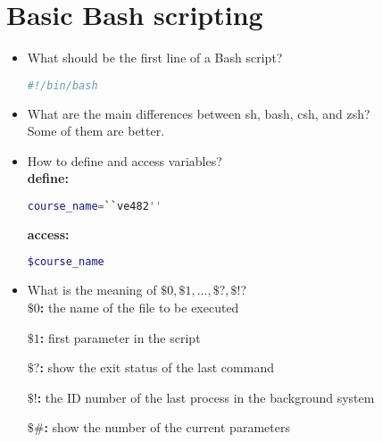 \documentclass{article}
\begin{document}
\section{Basic Bash scripting}
\begin{itemize}
\item What should be the first line of a Bash script?\\
\begin{lstlisting}[language=bash]
#!/bin/bash
\end{lstlisting}
\item What are the main differences between sh, bash, csh, and zsh?\\
Some of them are better.
\item How to define and access variables?\\
\textbf{define:}
\begin{lstlisting}[language=bash]
course_name=``ve482''
\end{lstlisting}
\textbf{access:}
\begin{lstlisting}[language=bash]
$course_name
\end{lstlisting}
\item What is the meaning of $\$0, \$1,..., \$?, \$!$?\\
\textbf{$\$0$:} the name of the file to be executed

\textbf{$\$1$:} first parameter in the script

\textbf{$\$?$:} show the exit status of the last command

\textbf{$\$!$:} the ID number of the last process in the background system

\textbf{$\$\#$:} show the number of the current parameters


\end{itemize}
\end{document}
